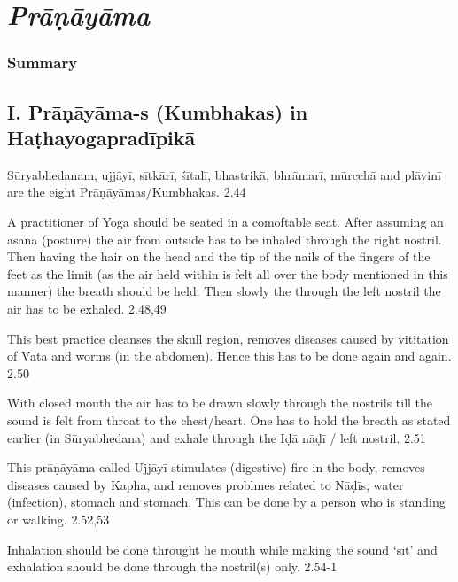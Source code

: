 \chapter{\textit{Prāṇāyāma}}

\subsection*{Summary}

\section*{I. Prāṇāyāma-s (Kumbhakas) in Haṭhayogapradī\-pikā}

Sūryabhedanam, ujjāyī, sītkārī, śītalī, bhastrikā, bhrāmarī, mūrcchā and plāvinī are the eight Prāṇāyāmas/Kumbhakas. 2.44


A practitioner of Yoga should be seated in a comoftable seat. After assuming an āsana (posture) the air from outside has to be inhaled through the right nostril.  Then having the hair on the head and the tip of the nails of the fingers of the feet as the limit (as the air held within is felt all over the body mentioned in this manner) the breath should be held. Then slowly the through the left nostril the air has to be exhaled.  2.48,49


This best practice cleanses the skull region, removes diseases caused by vititation of Vāta and worms (in the abdomen). Hence this has to be done again and again. 2.50


With closed mouth the air has to be drawn slowly through the nostrils till the sound is felt from throat to the chest/heart. One has to hold the breath as stated earlier (in Sūryabhedana) and exhale through the Iḍā nāḍī / left nostril. 2.51


This prāṇāyāma called Ujjāyī stimulates (digestive) fire in the body, removes diseases caused by Kapha, and removes problmes related to Nāḍīs, water (infection), stomach and stomach. This can be done by a person who is standing or walking.  2.52,53


Inhalation should be done throught he mouth while making the sound ‘sīt’ and exhalation should be done through the nostril(s) only. 2.54-1

